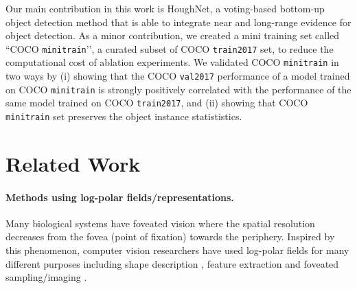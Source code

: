 \documentclass[runningheads]{llncs}
\begin{document}
Our main contribution in this work is HoughNet, a voting-based bottom-up object detection method that is able to integrate near and long-range evidence for object detection. As a minor contribution, we created a mini training set called ``COCO \texttt{minitrain}’’, a curated subset of COCO \texttt{train2017} set, to reduce the computational cost of ablation experiments. We validated COCO \texttt{minitrain} in two ways by (i) showing that the COCO \texttt{val2017} performance of a model trained on COCO \texttt{minitrain} is strongly positively correlated with the performance of the same model trained on COCO \texttt{train2017}, and (ii) showing that COCO \texttt{minitrain} set preserves the object instance statististics. 





\section{Related Work}


\paragraph{\textbf{Methods using log-polar fields/representations.}} Many biological systems have foveated vision  where the spatial resolution decreases from the fovea (point of fixation) towards the periphery. Inspired by this phenomenon, computer vision researchers have used log-polar fields for many different purposes including shape description \cite{shapematching}, feature extraction  \cite{akbas2017object} and foveated sampling/imaging \cite{roboticlogpolar}. 
\end{document}
